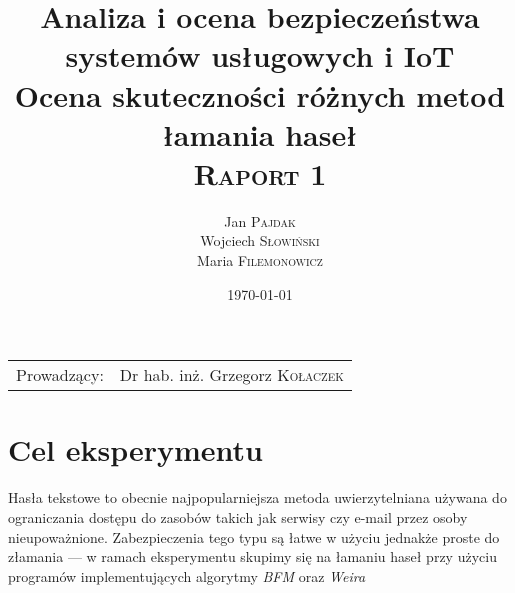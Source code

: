 \documentclass{article}
\title{Analiza i ocena bezpieczeństwa systemów usługowych i IoT \\ Ocena skuteczności różnych metod łamania haseł \\ \textsc{Raport 1}}
\author{Jan \textsc{Pajdak} \\ Wojciech \textsc{Słowiński} \\ Maria \textsc{Filemonowicz}}
\date{\today}
\begin{document}
\maketitle
\begin{center}
\begin{tabular}{l r}
Prowadzący: &  Dr hab. inż. Grzegorz \textsc{Kołaczek}
\end{tabular}
\end{center}








\newpage
\section{Cel eksperymentu}
Hasła tekstowe to obecnie najpopularniejsza metoda uwierzytelniana używana do ograniczania dostępu do zasobów takich jak serwisy czy e-mail przez osoby nieupoważnione. Zabezpieczenia tego typu są łatwe w użyciu jednakże proste do złamania — w ramach eksperymentu skupimy się na łamaniu haseł przy użyciu programów implementujących algorytmy \textit{BFM} oraz \textit{Weira}
\end{document}
